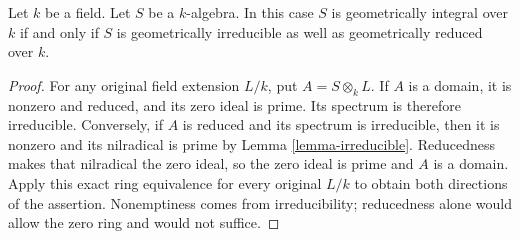 \begin{lemma}
\label{lemma-geometrically-integral}
Let $k$ be a field.
Let $S$ be a $k$-algebra.
In this case $S$ is geometrically integral over $k$ if and only if
$S$ is geometrically irreducible as well as geometrically reduced over $k$.
\end{lemma}

\begin{proof}
For any original field extension $L/k$,
put $A=S\otimes_k L$. If $A$ is
a domain, it is nonzero and reduced,
and its zero ideal is prime. Its
spectrum is therefore irreducible.
Conversely, if $A$ is reduced and
its spectrum is irreducible, then
it is nonzero and its nilradical
is prime by Lemma \ref{lemma-irreducible}.
Reducedness makes that nilradical
the zero ideal, so the zero ideal
is prime and $A$ is a domain.
Apply this exact ring equivalence
for every original $L/k$ to obtain
both directions of the assertion.
Nonemptiness comes from irreducibility;
reducedness alone would allow the
zero ring and would not suffice.
\end{proof}